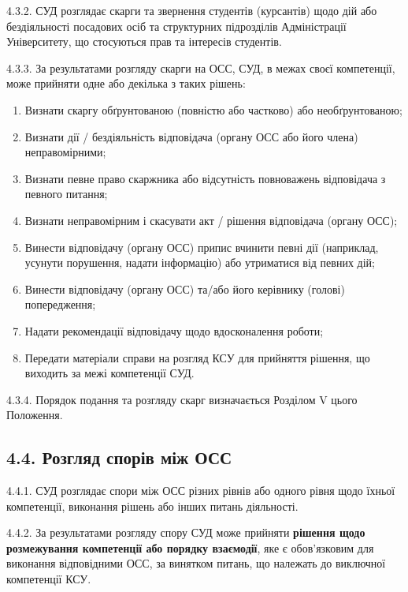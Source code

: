     4.3.2. СУД розглядає скарги та звернення студентів (курсантів) щодо дій або бездіяльності посадових осіб та структурних підрозділів Адміністрації Університету, що стосуються прав та інтересів студентів.

    4.3.3. За результатами розгляду скарги на ОСС, СУД, в межах своєї компетенції, може прийняти одне або декілька з таких рішень:
        \begin{enumerate}[label=\alph*)]
            \item Визнати скаргу обґрунтованою (повністю або частково) або необґрунтованою;
            \item Визнати дії / бездіяльність відповідача (органу ОСС або його члена) неправомірними;
            \item Визнати певне право скаржника або відсутність повноважень відповідача з певного питання;
            \item Визнати неправомірним і скасувати акт / рішення відповідача (органу ОСС);
            \item Винести відповідачу (органу ОСС) припис вчинити певні дії (наприклад, усунути порушення, надати інформацію) або утриматися від певних дій;
            \item Винести відповідачу (органу ОСС) та/або його керівнику (голові) попередження;
            \item Надати рекомендації відповідачу щодо вдосконалення роботи;
            \item Передати матеріали справи на розгляд КСУ для прийняття рішення, що виходить за межі компетенції СУД.
        \end{enumerate}

    4.3.4. Порядок подання та розгляду скарг визначається Розділом V цього Положення.

\subsection*{4.4. Розгляд спорів між ОСС}
    4.4.1. СУД розглядає спори між ОСС різних рівнів або одного рівня щодо їхньої компетенції, виконання рішень або інших питань діяльності.

    4.4.2. За результатами розгляду спору СУД може прийняти \textbf{рішення щодо розмежування компетенції або порядку взаємодії}, яке є обов'язковим для виконання відповідними ОСС, за винятком питань, що належать до виключної компетенції КСУ.

